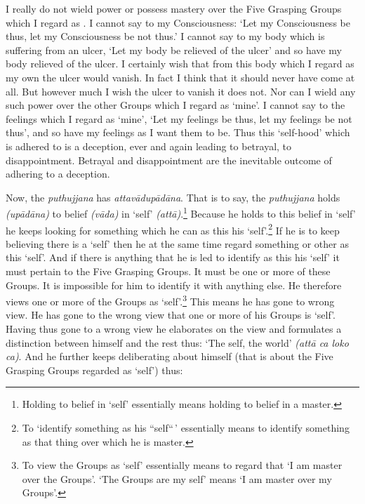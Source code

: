 I really do not wield power or possess mastery over the Five Grasping Groups which I regard as . I cannot say to my Consciousness: `Let my Consciousness be thus, let my Consciousness be not thus.' I cannot say to my body which is suffering from an ulcer, `Let my body be relieved of the ulcer' and so have my body relieved of the ulcer. I certainly wish that from this body which I regard as my own the ulcer would vanish. In fact I think that it should never have come at all. But however much I wish the ulcer to vanish it does not. Nor can I wield any such power over the other Groups which I regard as `mine'. I cannot say to the feelings which I regard as `mine', `Let my feelings be thus, let my feelings be not thus', and so have my feelings as I want them to be. Thus this `self-hood' which is adhered to is a deception, ever and again leading to betrayal, to disappointment. Betrayal and disappointment are the inevitable outcome of adhering to a deception.

Now, the \emph{puthujjana} has \emph{attavādupādāna}. That is to say, the \emph{puthujjana} holds \emph{(upādāna)} to belief \emph{(vāda)} in `self' \emph{(attā)}.\footnote{Holding to belief in `self' essentially means holding to belief in a master.} Because he holds to this belief in `self' he keeps looking for something which he can  as this his `self'.\footnote{To `identify something as his ``self``\,' essentially means to identify something as that thing over which he is master.} If he is to keep believing there is a `self' then he  at the same time regard something or other as this `self'. And if there is anything that he is led to identify as this his `self' it must pertain to the Five Grasping Groups. It must be one or more of these Groups. It is impossible for him to identify it with anything else. He therefore views one or more of the Groups as `self'.\footnote{To view the Groups as `self' essentially means to regard that `I am master over the Groups'. `The Groups are my self' means `I am master over my Groups'.} This means he has gone to wrong view. He has gone to the wrong view that one or more of his Groups is `self'. Having thus gone to a wrong view he elaborates on the view and formulates a distinction between himself and the rest thus: `The self, the world' \emph{(attā ca loko ca)}. And he further keeps deliberating about himself (that is about the Five Grasping Groups regarded as `self') thus:

